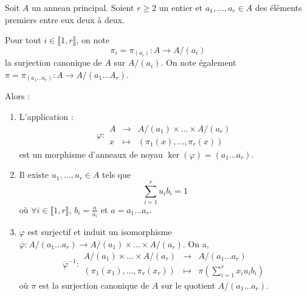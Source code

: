 






  Soit $A$ un anneau principal. Soient $r \geq 2$ un entier et $a_1, \dots, a_r \in A$ des éléments premiers entre eux deux à deux.

  \begin{notation}
    Pour tout $i \in \llbracket 1, r \rrbracket$, on note
    \[ \pi_i = \pi_{(a_i)} : A \rightarrow A/(a_i) \]
    la surjection canonique de $A$ sur $A/(a_i)$. On note également $\pi = \pi_{(a_1 \dots a_r)} : A \rightarrow A/(a_1 \dots A_r)$.
  \end{notation}

  \begin{theorem}[Chinois]
    \label{theoreme-chinois-1}
    Alors :
    \begin{enumerate}[label=(\roman*)]
      \item L'application :
      \[
        \varphi :
        \begin{array}{ccc}
          A &\rightarrow& A/(a_1) \times \dots \times A/(a_r) \\
          x &\mapsto& (\pi_1(x), \dots, \pi_r(x))
        \end{array}
      \]
      est un morphisme d'anneaux de noyau $\ker(\varphi) = (a_1 \dots a_r)$.
      \item Il existe $u_1, \dots, u_r \in A$ tels que
      \[ \sum_{i=1}^{r} u_i b_i = 1 \]
      où $\forall i \in \llbracket 1, r \rrbracket$, $b_i = \frac{a}{a_i}$ et $a = a_1 \dots a_r$.
      \item $\varphi$ est surjectif et induit un isomorphisme $\overline{\varphi} : A/(a_1 \dots a_r) \rightarrow A/(a_1) \times \dots \times A/(a_r)$. On a,
      \[
        \overline{\varphi}^{-1} :
        \begin{array}{ccc}
          A/(a_1) \times \dots \times A/(a_r) &\rightarrow& A/(a_1 \dots a_r) \\
          (\pi_1(x_1), \dots, \pi_r(x_r)) &\mapsto& \pi \left( \sum_{i=1}^{r} x_i u_i b_i \right)
        \end{array}
      \]
      où $\pi$ est la surjection canonique de $A$ sur le quotient $A/(a_1 \dots a_r)$.
    \end{enumerate}
  \end{theorem}

